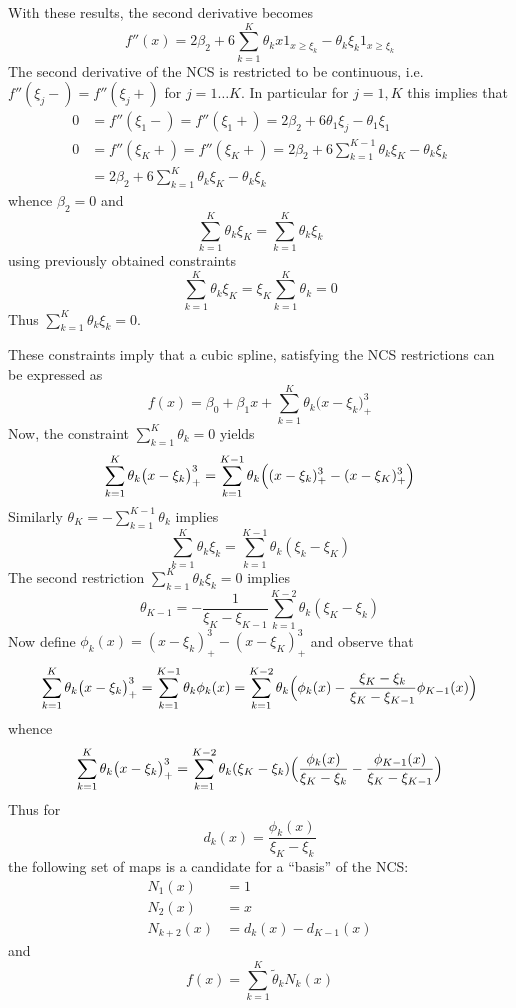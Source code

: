 \documentclass[a4paper]{article}
\begin{document}
With these results, the second derivative becomes
\[
f''(x)
= 2\beta_2
	+ 6 \sum_{k=1}^K \theta_k x 1_{x\geq \xi_k} - \theta_k \xi_k 1_{x\geq \xi_k}
\]
The second derivative of the NCS is restricted to be continuous, i.e.
$f''(\xi_j-)=f''(\xi_j+)$ for $j=1\ldots K$. In particular for $j=1,K$ this implies
that
\begin{align*}
	0 &= f''(\xi_1-) = f''(\xi_1+)
	= 2\beta_2 + 6 \theta_1 \xi_j - \theta_1 \xi_1\\
	0 &= f''(\xi_K+) = f''(\xi_K+)
	= 2\beta_2 + 6 \sum_{k=1}^{K-1} \theta_k \xi_K - \theta_k \xi_k\\
	&= 2\beta_2 + 6 \sum_{k=1}^K \theta_k \xi_K - \theta_k \xi_k
\end{align*}
whence $\beta_2 = 0$ and 
\[\sum_{k=1}^K \theta_k \xi_K = \sum_{k=1}^K \theta_k \xi_k\]
using previously obtained constraints
\[
\sum_{k=1}^K \theta_k \xi_K
= \xi_K \sum_{k=1}^K \theta_k
= 0
\]
Thus $\sum_{k=1}^K \theta_k \xi_k = 0$.

These constraints imply that a cubic spline, satisfying the NCS restrictions can be
expressed as
\[f(x) = \beta_0 + \beta_1 x + \sum_{k=1}^K \theta_k \bigl(x-\xi_k\bigr)_+^3\]
Now, the constraint $\sum_{k=1}^K \theta_k = 0$ yields
\[
\sum_{k=1}^K \theta_k \bigl(x-\xi_k\bigr)_+^3
= \sum_{k=1}^{K-1} \theta_k \Bigl((x-\xi_k)_+^3 - (x-\xi_K)_+^3\Bigr)
\]
Similarly $\theta_K = - \sum_{k=1}^{K-1} \theta_k$ implies
\[ \sum_{k=1}^K \theta_k \xi_k = \sum_{k=1}^{K-1} \theta_k ( \xi_k - \xi_K ) \]
The second restriction $\sum_{k=1}^K \theta_k \xi_k = 0$ implies
\[
\theta_{K-1} = - \frac{1}{\xi_K - \xi_{K-1}}\sum_{k=1}^{K-2} \theta_k ( \xi_K - \xi_k )
\]
Now define $\phi_k(x) = (x-\xi_k)_+^3 - (x-\xi_K)_+^3$ and observe that
\[
\sum_{k=1}^K \theta_k \bigl(x-\xi_k\bigr)_+^3
= \sum_{k=1}^{K-1} \theta_k \phi_k(x)
= \sum_{k=1}^{K-2} \theta_k \Bigl( \phi_k(x) - \frac{\xi_K - \xi_k}{\xi_K - \xi_{K-1}} \phi_{K-1}(x) \Bigr)
\]
whence
\[
\sum_{k=1}^K \theta_k \bigl(x-\xi_k\bigr)_+^3
= \sum_{k=1}^{K-2} \theta_k (\xi_K - \xi_k) \Bigl( \frac{\phi_k(x)}{\xi_K - \xi_k} - \frac{\phi_{K-1}(x)}{\xi_K - \xi_{K-1}} \Bigr)
\]
Thus for
\[ d_k(x) = \frac{\phi_k(x)}{\xi_K - \xi_k} \]
the following set of maps is a candidate for a ``basis'' of the NCS:
\begin{align*}
	N_1(x) &= 1\\
	N_2(x) &= x\\
	N_{k+2}(x) &= d_k(x) - d_{K-1}(x)
\end{align*}
and
\[f(x) = \sum_{k=1}^K \tilde{\theta}_k N_k(x)\]
\end{document}
